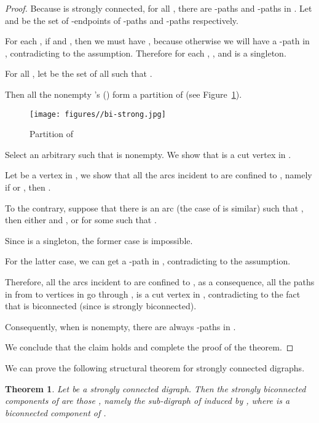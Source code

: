 \documentclass{article}
\newtheorem{thm}{Theorem}
\begin{document}
\begin{proof}
Because  is strongly connected, for all , there are -paths and -paths in . Let
 and  be the set of
-endpoints of -paths and -paths respectively.

For each , if  and ,
then we must have , because otherwise
we will have a -path in , contradicting to the assumption.
Therefore for each ,
, and 
is a singleton.

For all , let  be the set of
all  such that
.

Then all the nonempty 's ()
form a partition of  (see
Figure~\ref{fig:bi-strong}).

\begin{figure}[ht]
\centering
  \texttt{[image: figures//bi-strong.jpg]}
  \caption{Partition of }\label{fig:bi-strong}
\end{figure}

Select an arbitrary  such that 
is nonempty. We show that  is a cut vertex in
.

Let  be a vertex in , we show that all the arcs
incident to  are confined to ,
namely if  or , then .

To the contrary, suppose that there is an arc  (the case of
 is similar) such that , then either  and , or
 for some 
such that .

Since  is a singleton, the
former case is impossible.

For the latter case, we can get a -path in , contradicting
to the assumption.

Therefore, all the arcs incident to  are confined to
, as a consequence, all the paths
in  from  to vertices in  go
through ,  is a cut vertex in ,
contradicting to the fact that  is biconnected
(since  is strongly biconnected).

Consequently, when  is nonempty, there are
always -paths in .

We conclude that the claim holds and complete the proof of the
theorem.

\end{proof}



\noindent We can prove the following structural theorem for strongly
connected digraphs.

\begin{thm}\label{thm:strong2}
Let  be a strongly connected digraph. Then the strongly
biconnected components of  are those , namely the
sub-digraph of  induced by , where  is a biconnected
component of .
\end{thm}
\end{document}
